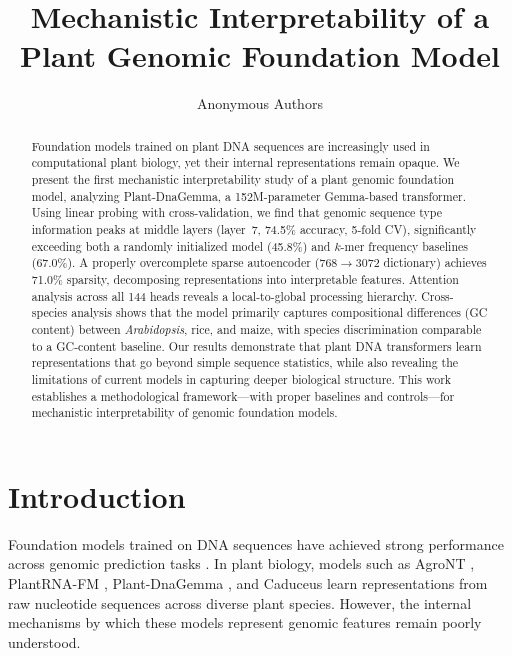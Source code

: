 \documentclass{article}
\title{Mechanistic Interpretability of a Plant Genomic Foundation Model}
\author{%
  Anonymous Authors \\
}
\begin{document}
\maketitle

\begin{abstract}
Foundation models trained on plant DNA sequences are increasingly used in computational plant biology, yet their internal representations remain opaque. We present the first mechanistic interpretability study of a plant genomic foundation model, analyzing Plant-DnaGemma, a 152M-parameter Gemma-based transformer. Using linear probing with cross-validation, we find that genomic sequence type information peaks at middle layers (layer~7, 74.5\% accuracy, 5-fold CV), significantly exceeding both a randomly initialized model (45.8\%) and $k$-mer frequency baselines (67.0\%). A properly overcomplete sparse autoencoder (768$\to$3072 dictionary) achieves 71.0\% sparsity, decomposing representations into interpretable features. Attention analysis across all 144 heads reveals a local-to-global processing hierarchy. Cross-species analysis shows that the model primarily captures compositional differences (GC content) between \textit{Arabidopsis}, rice, and maize, with species discrimination comparable to a GC-content baseline. Our results demonstrate that plant DNA transformers learn representations that go beyond simple sequence statistics, while also revealing the limitations of current models in capturing deeper biological structure. This work establishes a methodological framework---with proper baselines and controls---for mechanistic interpretability of genomic foundation models.
\end{abstract}

\section{Introduction}

Foundation models trained on DNA sequences have achieved strong performance across genomic prediction tasks \citep{dalla2023nucleotide, nguyen2024hyenadna, ji2021dnabert, zhou2023dnabert2}. In plant biology, models such as AgroNT \citep{mendoza2024agront}, PlantRNA-FM \citep{yu2024plantrna}, Plant-DnaGemma \citep{zhang2024plantdnagemma}, and Caduceus \citep{schiff2024caduceus} learn representations from raw nucleotide sequences across diverse plant species. However, the internal mechanisms by which these models represent genomic features remain poorly understood.
\end{document}
